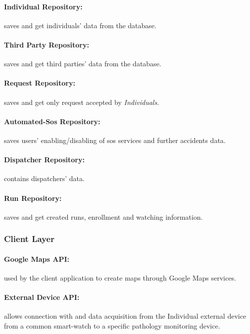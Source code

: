 \documentclass[a4paper]{article}
\begin{document}
    \paragraph{Individual Repository:}
    saves and get individuals' data from the database.
    
    \paragraph{Third Party Repository:}
    saves and get third parties' data from the database.
    
    \paragraph{Request Repository:}
    saves and get only request accepted by \textit{Individuals}.
    
    \paragraph{Automated-Sos Repository:}
    saves users' enabling/disabling of sos services and further accidents data.
    
    \paragraph{Dispatcher Repository:}
    contains dispatchers' data.
    
    \paragraph{Run Repository:}
    saves and get created runs, enrollment and watching information.
    
    \subsubsection{Client Layer}
    
    \paragraph{Google Maps API:}
    used by the client application to create maps through Google Maps services.
    
    \paragraph{External Device API:}
    allows connection with and data acquisition from the Individual external device from a common smart-watch to a specific pathology monitoring device.
    
\end{document}
